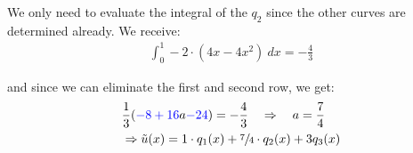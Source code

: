 We only need to evaluate the integral of the $q_2$ since the other curves are determined already.
We receive:
\begin{align*}
    \int_0^1 -2\cdot (4x-4x^2)\ dx = -\frac{4}{3}
\end{align*}

and since we can eliminate the first and second row, we get:
\begin{align*}
    & \frac{1}{3}({\color{blue}-8 + 16}a {\color{blue}- 24}) = -\frac{4}{3}\quad\Rightarrow\quad a=\frac{7}{4} \\
    & \Rightarrow \tilde{u}(x) = 1\cdot q_1(x) + \sfrac{7}{4}\cdot q_2(x) + 3 q_3(x)
\end{align*}
